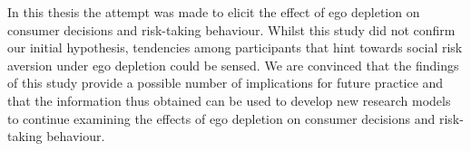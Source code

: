 In this thesis the attempt was made to elicit the effect of ego depletion on consumer decisions and risk-taking behaviour. Whilst this study did not confirm our initial hypothesis, tendencies among participants that hint towards social risk aversion under ego depletion could be sensed. We are convinced that the findings of this study provide a possible number of implications for future practice and that the information thus obtained can be used to develop new research models to continue examining the effects of ego depletion on consumer decisions and risk-taking behaviour.\par
